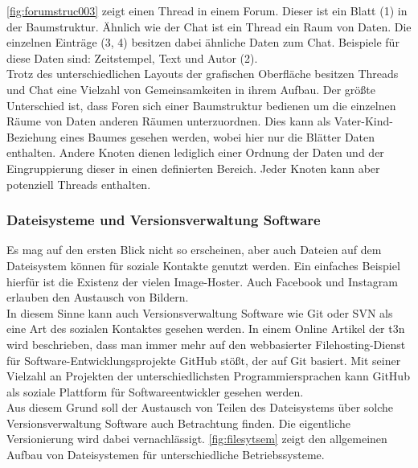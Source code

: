 \documentclass[a4paper]{article}
\begin{document}
	\autoref{fig:forumstruc003} zeigt einen Thread in einem Forum. Dieser ist
	ein Blatt (1) in der Baumstruktur. Ähnlich wie der Chat ist ein Thread ein
	Raum von Daten. Die einzelnen Einträge (3, 4) besitzen dabei  ähnliche Daten
	zum Chat. Beispiele für diese Daten sind: Zeitstempel, Text und Autor (2). \\
	
	Trotz des unterschiedlichen Layouts der grafischen Oberfläche besitzen
	Threads und Chat eine Vielzahl von Gemeinsamkeiten in ihrem Aufbau. Der
	größte Unterschied ist, dass Foren sich einer Baumstruktur bedienen um
	die einzelnen Räume von Daten anderen Räumen unterzuordnen. Dies kann
	als Vater-Kind-Beziehung eines Baumes gesehen werden, wobei hier nur die Blätter
	Daten enthalten. Andere Knoten dienen lediglich einer Ordnung der Daten und 
	der Eingruppierung dieser in einen definierten Bereich. Jeder Knoten kann
	aber potenziell Threads enthalten.
	
	\subsubsection{Dateisysteme und Versionsverwaltung Software}	
	
	Es mag auf den ersten Blick nicht so erscheinen, aber auch Dateien auf
	dem Dateisystem können für soziale Kontakte genutzt werden. Ein einfaches
	Beispiel hierfür ist die Existenz der vielen Image-Hoster. Auch 
	Facebook und Instagram erlauben den Austausch von Bildern. \\
	
	\newpage
	In diesem Sinne kann auch Versionsverwaltung Software wie Git oder SVN als
	eine Art des sozialen Kontaktes gesehen werden. In einem Online Artikel der
	t3n \cite{articleGitHub} wird beschrieben, dass man immer mehr auf den
	webbasierter Filehosting-Dienst für Software-Entwicklungsprojekte GitHub
	\cite{gitHub} stößt, der auf Git basiert. Mit seiner Vielzahl an Projekten
	der unterschiedlichsten Programmiersprachen kann GitHub als soziale Plattform
	für Softwareentwickler gesehen werden. \\
	
	Aus diesem Grund soll der Austausch von Teilen des Dateisystems über solche 
	Versionsverwaltung Software auch Betrachtung finden. Die eigentliche
	Versionierung wird dabei vernachlässigt. \autoref{fig:filesytsem}
	zeigt den allgemeinen Aufbau von Dateisystemen für unterschiedliche
	Betriebssysteme.
	
\end{document}

